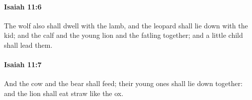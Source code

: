 		\paragraph{Isaiah 11:6} %
			\label{ISAIAH-11-6}

			The wolf also shall dwell with the lamb, and the leopard shall lie down with the kid; and the calf and the young lion and the fatling together; and a little child shall lead them.


		\paragraph{Isaiah 11:7} %
			\label{ISAIAH-11-7}

			And the cow and the bear shall feed; their young ones shall lie down together: and the lion shall eat straw like the ox.


